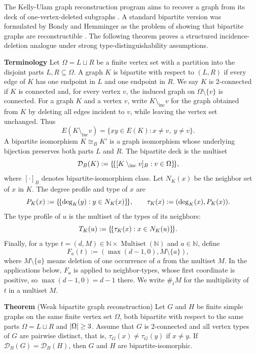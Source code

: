 The Kelly-Ulam graph reconstruction program aims to recover a graph from its deck of one-vertex-deleted subgraphs \cite{ulam1960collection, Kelly1957}. A standard bipartite version was formulated by Bondy and Hemminger as the problem of showing that bipartite graphs are reconstructible \cite{BondyHemminger1977}. The following theorem proves a structured incidence-deletion analogue under strong type-distinguishability assumptions. 

\noindent \textbf{Terminology}
Let $\Omega=L \sqcup R$ be a finite vertex set with a partition into the disjoint parts $L,R\subseteq \Omega$. 
A graph $K$ is bipartite with respect to $(L,R)$ if every edge of $K$ has one endpoint in $L$ and one endpoint in
$R$. We say $K$ is $2$-connected if $K$ is connected and, for every vertex $v$, the induced graph on
$\Omega\setminus\{v\}$ is connected. For a graph $K$ and a vertex $v$, write $K\setminus_{\mathrm{inc}} v$
for the graph obtained from $K$ by deleting all edges incident to $v$, while
leaving the vertex set unchanged. Thus 
\[
E(K\setminus_{\mathrm{inc}} v)=\{xy\in E(K):x\ne v,\ y\ne v\}.
\]
A bipartite isomorphism $K\cong_B K'$ is a graph isomorphism whose underlying
bijection preserves both parts $L$ and $R$. The bipartite deck is the multiset
\[
\mathcal D_B(K):=\{\!\{[K\setminus_{\mathrm{inc}} v]_B: v\in\Omega\}\!\},
\]
where $[\cdot]_B$ denotes bipartite-isomorphism class.
Let $N_K(x)$ be the neighbor set of $x$ in $K$. The degree profile and type of
$x$ are
\[
P_K(x):=\{\!\{\deg_{K}(y): y\in N_K(x)\}\!\},
\qquad
\tau_K(x):=(\deg_{K}(x),P_K(x)).
\]
The type profile of $u$ is the multiset of the types of its neighbors:
\[
T_K(u):=\{\!\{\tau_K(x): x\in N_K(u)\}\!\}.
\]
Finally, for a type $t=(d,M)\in\mathbb N\times\operatorname{Multiset}(\mathbb N)$ and $a\in\mathbb N$, define
\[
F_a(t):=(\max(d-1,0),M\setminus\{a\}),
\]
where $M\setminus\{a\}$ means deletion of one occurrence of $a$ from the multiset
$M$.  In the applications below, $F_a$ is applied to neighbor-types, whose
first coordinate is positive, so $\max(d-1,0)=d-1$ there.  We write
$\#_t M$ for the multiplicity of $t$ in a multiset $M$.


\noindent \textbf{Theorem} (\upshape Weak bipartite graph reconstruction)
Let $G$ and $H$ be finite simple graphs on the same finite vertex set
$\Omega$, both bipartite with respect to the same parts $\Omega=L\sqcup R$ and $\left|\Omega\right|\ge 3$. Assume that $G$ is 2-connected and all vertex types of $G$ are pairwise distinct, that is, $\tau_G(x)\ne \tau_G(y)$ if  $x\ne y$. If
$\mathcal D_B(G)=\mathcal D_B(H)$,
then $G$ and $H$ are bipartite-isomorphic.





